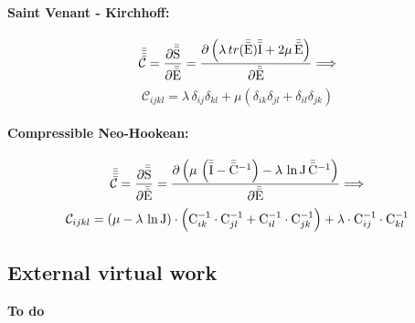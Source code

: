 \paragraph{Saint Venant - Kirchhoff:}

\begin{equation*}
    \bar{\bar{\bar{\bar{\mathcal{C}}}}} = \frac{\partial \bar{\bar{\mathrm{S}}}}{\partial \bar{\bar{\mathrm{E}}}} = \frac{\partial \left( \lambda \, tr(\bar{\bar{\mathrm{E}}}) \bar{\bar{\mathrm{I}}} + 2\mu \,\bar{\bar{\mathrm{E}}} \right)}{\partial \bar{\bar{\mathrm{E}}}} \Longrightarrow
\end{equation*}
\begin{equation} \label{eq:C_stk}
    \mathcal{C}_{ijkl} = \lambda \, \delta_{ij}\delta_{kl} + \mu \left( \delta_{ik}\delta_{jl} + \delta_{il}\delta_{jk} \right)
\end{equation}

\paragraph{Compressible Neo-Hookean:}

\begin{equation*}
    \bar{\bar{\bar{\bar{\mathcal{C}}}}} = \frac{\partial \bar{\bar{\mathrm{S}}}}{\partial \bar{\bar{\mathrm{E}}}} = \frac{\partial \left( \mu \, \left(\bar{\bar{\mathrm{I}}} - \bar{\bar{\mathrm{C}}}^{-1} \right) - \lambda \, \ln{\mathrm{J}} \, \bar{\bar{\mathrm{C}}}^{-1} \right)}{\partial \bar{\bar{\mathrm{E}}}} \Longrightarrow
\end{equation*}
\begin{equation} \label{eq:C_nhk}
    \mathcal{C}_{ijkl} = \left( \mu - \lambda \, \ln{\mathrm{J}} \right) \cdot \left( \mathrm{C}_{ik}^{-1} \cdot \mathrm{C}_{jl}^{-1} + \mathrm{C}_{il}^{-1} \cdot \mathrm{C}_{jk}^{-1} \right) + \lambda \cdot \mathrm{C}_{ij}^{-1} \cdot \mathrm{C}_{kl}^{-1}
\end{equation}

\subsection{External virtual work}

{\color{red}\textbf{To do}}
